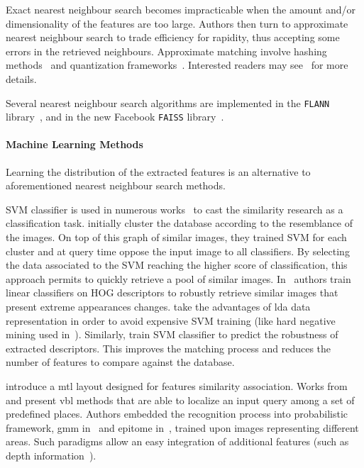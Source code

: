 			Exact nearest neighbour search becomes impracticable when the amount and/or dimensionality of the features are too large. Authors then turn to approximate nearest neighbour search to trade efficiency for rapidity, thus accepting some errors in the retrieved neighbours. Approximate matching involve hashing methods~\citep{Gionis1999} and quantization frameworks~\citep{Nister2006,Philbin2007,Jegou2011}. Interested readers may see~\citep{Wang2017} for more details.
				
			Several nearest neighbour search algorithms are implemented in the \texttt{FLANN} library~\citep{Muja2009}, and in the new Facebook \texttt{FAISS} library~\citep{Johnson2017}. 
				
		\paragraph{Machine Learning Methods}
			Learning the distribution of the extracted features is an alternative to aforementioned nearest neighbour search methods.
			
    	    SVM classifier is used in numerous works~\citep{Shrivastava2011,Cao2013,McManus2014,Aubry2014} to cast the similarity research as a classification task. \citet{Cao2013} initially cluster the database according to the resemblance of the images. On top of this graph of similar images, they trained SVM for each cluster and at query time oppose the input image to all classifiers. By selecting the data associated to the SVM reaching the higher score of classification, this approach permits to quickly retrieve a pool of similar images. In~\citep{McManus2014,Aubry2014} authors train linear classifiers on HOG descriptors to robustly retrieve similar images that present extreme appearances changes. \citet{Aubry2014} take the advantages of \ac{lda} data representation in order to avoid expensive SVM training (like hard negative mining used in~\citep{Shrivastava2011,Kim2015}). Similarly, \citet{Kim2015} train SVM classifier to predict the robustness of extracted descriptors. This improves the matching process and reduces the number of features to compare against the database. 
    	    
       	 	\citet{Lu2015} introduce a \ac{mtl} layout designed for features similarity association. Works from \citet{torralba2003context} and \citet{Ni2009} present \ac{vbl} methods that are able to localize an input query among a set of predefined places. Authors embedded the recognition process into probabilistic framework, \ac{gmm} in~\citep{torralba2003context} and epitome in~\citep{Ni2009}, trained upon images representing different areas. Such paradigms allow an easy integration of additional features (such as depth information~\citep{Ni2009}).

